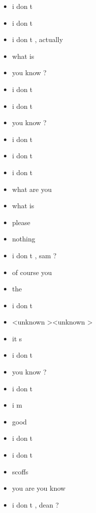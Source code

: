 \begin{multicols}{4}
\begin{itemize}[noitemsep]
		\item i don t
		\item i don t
		\item i don t , actually
		\item what is
		\item you know ?
		\item i don t
		\item i don t
		\item you know ?
		\item i don t
		\item i don t
		\item i don t
		\item what are you
		\item what is
		\item please
		\item nothing
		\item i don t , sam ?
		\item of course you
		\item the
		\item i don t
		\item \textless unknown \textgreater \textless unknown \textgreater
		\item it s
		\item i don t
		\item you know ?
		\item i don t
		\item i m
		\item good
		\item i don t
		\item i don t
		\item scoffs
		\item you are you know
		\item i don t , dean ?
	\end{itemize}
\end{multicols}